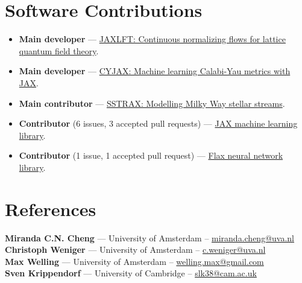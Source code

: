 \documentclass[11pt, a4paper]{article}
\begin{document}
\section*{Software Contributions}
\begin{itemize}[left=0pt, itemsep=3pt]
    \item \textbf{Main developer} — \href{https://github.com/mathisgerdes/continuous-flow-lft}{JAXLFT: Continuous normalizing flows for lattice quantum field theory}.
    \item \textbf{Main developer} — \href{https://github.com/ml4physics/cyjax}{CYJAX: Machine learning Calabi-Yau metrics with JAX}.
    \item \textbf{Main contributor} — \href{https://github.com/undark-lab/sstrax}{SSTRAX: Modelling Milky Way stellar streams}.
    \item \textbf{Contributor} (6 issues, 3 accepted pull requests) — \href{https://github.com/google/jax/issues?q=author:mathisgerdes}{JAX machine learning library}.
    \item \textbf{Contributor} (1 issue, 1 accepted pull request) — \href{https://github.com/google/flax/issues?q=author:mathisgerdes}{Flax neural network library}.
\end{itemize}


\section*{References}
\noindent
\textbf{Miranda C.N. Cheng} — University of Amsterdam -- \href{mailto:c.n.cheng@uva.nl}{miranda.cheng@uva.nl} \\
\textbf{Christoph Weniger} — University of Amsterdam  -- \href{mailto:c.weniger@uva.nl}{c.weniger@uva.nl} \\
\textbf{Max Welling} — University of Amsterdam -- \href{mailto:welling.max@gmail.com}{welling.max@gmail.com} \\
\textbf{Sven Krippendorf} — University of Cambridge -- \href{mailto:slk38@cam.ac.uk}{slk38@cam.ac.uk}
\end{document}
